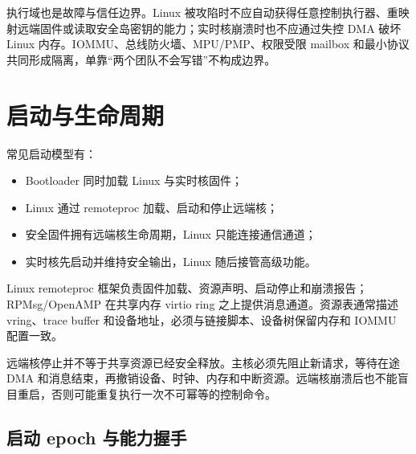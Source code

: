 执行域也是故障与信任边界。Linux 被攻陷时不应自动获得任意控制执行器、重映射远端固件或读取安全岛密钥的能力；实时核崩溃时也不应通过失控 DMA 破坏 Linux 内存。IOMMU、总线防火墙、MPU/PMP、权限受限 mailbox 和最小协议共同形成隔离，单靠“两个团队不会写错”不构成边界。

\section{启动与生命周期}

常见启动模型有：
\begin{itemize}
  \item Bootloader 同时加载 Linux 与实时核固件；
  \item Linux 通过 remoteproc 加载、启动和停止远端核；
  \item 安全固件拥有远端核生命周期，Linux 只能连接通信通道；
  \item 实时核先启动并维持安全输出，Linux 随后接管高级功能。
\end{itemize}

Linux remoteproc 框架负责固件加载、资源声明、启动停止和崩溃报告；RPMsg/OpenAMP 在共享内存 virtio ring 之上提供消息通道\cite{openamp-doc,linux-remoteproc}。资源表通常描述 vring、trace buffer 和设备地址，必须与链接脚本、设备树保留内存和 IOMMU 配置一致。

\begin{center}
\end{center}

远端核停止并不等于共享资源已经安全释放。主核必须先阻止新请求，等待在途 DMA 和消息结束，再撤销设备、时钟、内存和中断资源。远端核崩溃后也不能盲目重启，否则可能重复执行一次不可幂等的控制命令。

\subsection{启动 epoch 与能力握手}

